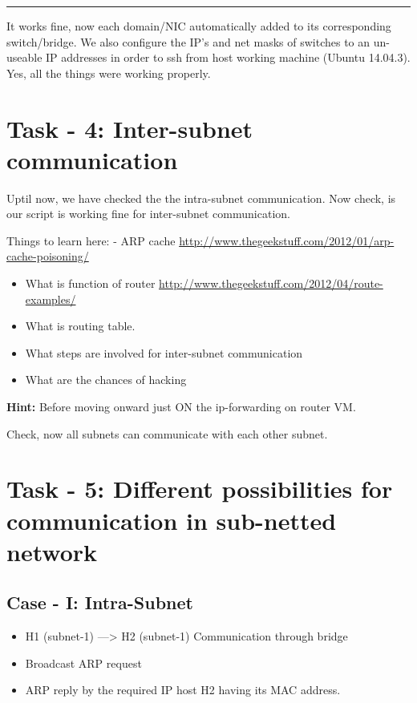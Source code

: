 \documentclass[letterpaper,10pt,english]{sphinxmanual}
\begin{document}
\bigskip\hrule{}\bigskip


It works fine, now each domain/NIC automatically added to its corresponding switch/bridge.
We also configure the IP's and net masks of switches to an un-useable IP addresses in order to ssh from host working machine (Ubuntu 14.04.3).
Yes, all the things were working properly.


\section{Task - 4: Inter-subnet communication}
\label{week-04:task-4-inter-subnet-communication}
Uptil now, we have checked the the intra-subnet communication. Now check, is our script is working fine for inter-subnet communication.

Things to learn here:
- ARP cache                     \href{http://www.thegeekstuff.com/2012/01/arp-cache-poisoning/}{http://www.thegeekstuff.com/2012/01/arp-cache-poisoning/}
\begin{itemize}
\item {} 
What is function of router     \href{http://www.thegeekstuff.com/2012/04/route-examples/}{http://www.thegeekstuff.com/2012/04/route-examples/}

\item {} 
What is routing table.

\item {} 
What steps are involved for inter-subnet communication

\item {} 
What are the chances of hacking

\end{itemize}

\textbf{Hint:} Before moving onward just ON the ip-forwarding on router VM.


Check, now all subnets can communicate with each other subnet.


\section{Task - 5: Different possibilities for communication in sub-netted network}
\label{week-04:task-5-different-possibilities-for-communication-in-sub-netted-network}

\subsection{Case - I: Intra-Subnet}
\label{week-04:case-i-intra-subnet}\begin{itemize}
\item {} 
H1 (subnet-1) ---\textgreater{} H2 (subnet-1)      Communication through bridge

\item {} 
Broadcast ARP request

\item {} 
ARP reply by the required IP host H2 having its MAC address.

\end{itemize}
\end{document}
